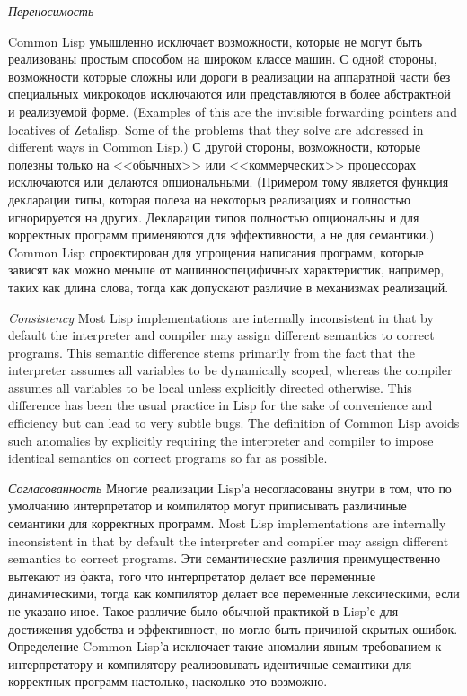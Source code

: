 \begin{flushdesc}
\item[{\it Переносимость}]

\begingroup{}
Common Lisp умышленно исключает возможности, которые не могут быть
реализованы простым способом на широком классе машин. С одной
стороны, возможности которые сложны или дороги в реализации на
аппаратной части без специальных микрокодов исключаются или
представляются в более абстрактной и реализуемой форме.
(Examples of this are the invisible forwarding pointers
and locatives of Zetalisp.  Some of the problems that they solve
are addressed in different ways in Common Lisp.)
С другой стороны, возможности, которые полезны только на
<<обычных>> или <<коммерческих>> процессорах исключаются или
делаются опциональными. (Примером тому является функция декларации
типы, которая полеза на некоторыз реализациях и полностью
игнорируется на других. Декларации типов полностью опциональны и
для корректных программ применяются для эффективности, а не для семантики.)
Common Lisp спроектирован для упрощения написания программ,
которые зависят как можно меньше от машинноспецифичных
характеристик, например, таких как длина слова, тогда как
допускают различие в механизмах реализаций.
\par\endgroup

\item[{\it Consistency}]
Most Lisp implementations are internally inconsistent
in that by default the interpreter and compiler may assign different
semantics to correct programs.
This semantic difference stems primarily from the fact
that the interpreter assumes all variables to be dynamically scoped,
whereas the compiler assumes all variables to be local unless explicitly
directed otherwise.  This difference has been the usual practice in Lisp
for the sake of convenience
and efficiency but can lead to very subtle bugs.  The definition of
Common Lisp avoids such anomalies by explicitly requiring the interpreter
and compiler to impose identical semantics on correct programs
so far as possible.

\item[{\it Согласованность}]
Многие реализации Lisp'а несогласованы внутри в том, что по
умолчанию интерпретатор и компилятор могут приписывать различиные
семантики для корректных программ.
Most Lisp implementations are internally inconsistent
in that by default the interpreter and compiler may assign different
semantics to correct programs.
Эти семантические различия преимущественно вытекают из факта, того
что интерпретатор делает все переменные динамическими, тогда как
компилятор делает все переменные лексическими, если не указано
иное. Такое различие было обычной практикой в Lisp'е для
достижения удобства и эффективност, но могло быть причиной скрытых
ошибок. Определение Common Lisp'а исключает такие аномалии явным
требованием к интерпретатору и компилятору реализовывать
идентичные семантики для корректных программ настолько, насколько
это возможно.


\end{flushdesc}
